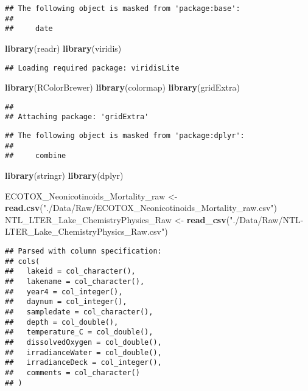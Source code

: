 \documentclass[]{article}
\newenvironment{Shaded}{\begin{snugshade}}{\end{snugshade}}
\newcommand{\KeywordTok}[1]{\textcolor[rgb]{0.13,0.29,0.53}{\textbf{#1}}}
\newcommand{\StringTok}[1]{\textcolor[rgb]{0.31,0.60,0.02}{#1}}
\newcommand{\NormalTok}[1]{#1}
\begin{document}
\begin{verbatim}
## The following object is masked from 'package:base':
## 
##     date
\end{verbatim}

\begin{Shaded}
\begin{Highlighting}[]
\KeywordTok{library}\NormalTok{(readr)}
\KeywordTok{library}\NormalTok{(viridis)}
\end{Highlighting}
\end{Shaded}

\begin{verbatim}
## Loading required package: viridisLite
\end{verbatim}

\begin{Shaded}
\begin{Highlighting}[]
\KeywordTok{library}\NormalTok{(RColorBrewer)}
\KeywordTok{library}\NormalTok{(colormap)}
\KeywordTok{library}\NormalTok{(gridExtra)}
\end{Highlighting}
\end{Shaded}

\begin{verbatim}
## 
## Attaching package: 'gridExtra'
\end{verbatim}

\begin{verbatim}
## The following object is masked from 'package:dplyr':
## 
##     combine
\end{verbatim}

\begin{Shaded}
\begin{Highlighting}[]
\KeywordTok{library}\NormalTok{(stringr)}
\KeywordTok{library}\NormalTok{(dplyr)}

\NormalTok{ECOTOX_Neonicotinoids_Mortality_raw <-}\StringTok{ }\KeywordTok{read.csv}\NormalTok{(}\StringTok{"./Data/Raw/ECOTOX_Neonicotinoids_Mortality_raw.csv"}\NormalTok{)}
\NormalTok{NTL_LTER_Lake_ChemistryPhysics_Raw <-}\StringTok{ }\KeywordTok{read_csv}\NormalTok{(}\StringTok{"./Data/Raw/NTL-LTER_Lake_ChemistryPhysics_Raw.csv"}\NormalTok{)}
\end{Highlighting}
\end{Shaded}

\begin{verbatim}
## Parsed with column specification:
## cols(
##   lakeid = col_character(),
##   lakename = col_character(),
##   year4 = col_integer(),
##   daynum = col_integer(),
##   sampledate = col_character(),
##   depth = col_double(),
##   temperature_C = col_double(),
##   dissolvedOxygen = col_double(),
##   irradianceWater = col_double(),
##   irradianceDeck = col_integer(),
##   comments = col_character()
## )
\end{verbatim}
\end{document}

